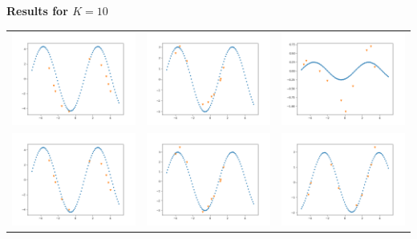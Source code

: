 \documentclass[a4paper]{article}
\begin{document}
\pagebreak
\textbf{Results for $K = 10$}
\begin{table}[h!]
\centering
\begin{tabular}{c c c}
\includegraphics[width=5cm]{10shot1_1.png} & \includegraphics[width=5cm]{10shot1_2.png} & \includegraphics[width=5cm]{10shot1_3.png} \\
\includegraphics[width=5cm]{10shot5_1.png} & \includegraphics[width=5cm]{10shot5_2.png} & \includegraphics[width=5cm]{10shot5_3.png} \\
\end{tabular}
\end{table}
\end{document}
